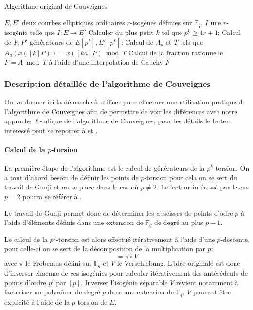 \documentclass[10pt,a4paper]{book}
\theoremstyle{plain}
\theoremstyle{definition}
\theoremstyle{definition}
\theoremstyle{definition}
\theoremstyle{definition}
\theoremstyle{remark}
\theoremstyle{remark}
\theoremstyle{definition}
\begin{document}
\begin{algorithm}
\caption{\label{alg:orig:Couv} Algorithme original de Couveignes}
\begin{algorithmic}[1]
\REQUIRE $E,E'$ deux courbes elliptiques ordinaires $r$-isogènes définies sur $\mathbb{F}_q$,%
\ENSURE $I$ une $r$-isogénie telle que $I:E \rightarrow E'$
\STATE Calculer du plus petit $k$ tel que $p^k \geqslant 4r+1$;
\STATE Calcul de $P,P'$ générateurs de $E[p^k],E'[p^k]$;
\STATE Calcul de $A_a$ et $T$ tels que $A_a(x([k]P))=x([ka]P) \bmod T$
\STATE Calcul de la fraction rationnelle $F=A \bmod T$ à l'aide d'une 
interpolation de Cauchy
\RETURN $F$
\ENDIF
\ENDFOR
\end{algorithmic}
\end{algorithm}

\subsubsection{Description détaillée de l'algorithme de Couveignes }
On va donner ici la démarche à utiliser pour effectuer une utilisation 
pratique de l'algorithme de Couveignes afin de permettre de voir les différences
avec notre approche $\ell$-adique de l'algorithme de Couveignes, pour les 
détails le lecteur interessé peut se reporter à \cite{Couveignes96} et 
\cite{DeFeo11}.
\paragraph{Calcul de la $p$-torsion}
La première étape de l'algorithme est le calcul de générateurs de la $p^k$ 
torsion. On a tout d'abord besoin de définir les points de $p$-torsion pour 
cela on se sert du travail de Gunji \cite{Gunji76} et on se place dans le cas 
où $p \neq 2$. Le lecteur intéressé par le cas $p=2$ pourra se référer à 
\cite[3.2]{DeFeo11}.

Le travail de Gunji \cite[Theorem 4]{Gunji76} permet donc de déterminer les 
abscisses de points d'odre $p$ à l'aide d'éléments définis dans une extension 
de $\mathbb{F}_q$ de degré au plus $p-1$.  

Le calcul de la $p^k$-torsion est alors effectué itérativement à l'aide d'une 
$p$-descente, pour celle-ci on se sert de la décomposition de la multiplication
par $p$: 
\begin{equation}
[p]=\pi \circ V
\end{equation}
avec $\pi$ le Frobenius défini sur $\mathbb{F}_q$ et $V$ le Verschiebung. 
L'idée originale est donc d'inverser chacune  de ces isogénies pour calculer 
itérativement des antécédents de points d'ordre $p^i$ par $[p]$. Inverser 
l'isogénie séparable $V$ revient notamment à factoriser un polynôme de degré 
$p$ dans une extension de $\mathbb{F}_q$, $V$ pouvant être explicité à l'aide 
de la $p$-torsion de $E$. 
\end{document}
